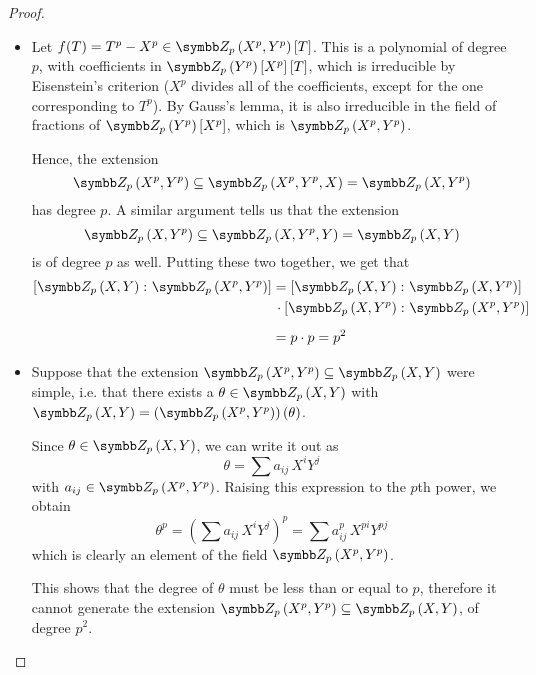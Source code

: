\begin{proof}
~
\begin{itemize}
    \item Let \(f(T) = T^p - X^p \in \ringadjoin{\adjoin[\integersmod{p}]{X^p, Y^p}}{T}\). This is a polynomial of degree \(p\), with coefficients in \(\ringadjoin{\ringadjoin{\adjoin[\integersmod{p}]{Y^p}}{X^p}}{T}\), which is irreducible by Eisenstein's criterion (\(X^p\) divides all of the coefficients, except for the one corresponding to \(T^p\)). By Gauss's lemma, it is also irreducible in the field of fractions of \(\ringadjoin{\adjoin[\integersmod{p}]{Y^p}}{X^p}\), which is \(\adjoin[\integersmod{p}]{X^p, Y^p}\).

    Hence, the extension
    \[
        \adjoin[\integersmod{p}]{X^p, Y^p} \subseteq \adjoin[\integersmod{p}]{X^p, Y^p, X} = \adjoin[\integersmod{p}]{X, Y^p}
    \] has degree \(p\). A similar argument tells us that the extension
    \[
        \adjoin[\integersmod{p}]{X, Y^p} \subseteq \adjoin[\integersmod{p}]{X, Y^p, Y} = \adjoin[\integersmod{p}]{X, Y}
    \]
    is of degree \(p\) as well. Putting these two together, we get that
    \begin{align*}
        \degree{\adjoin[\integersmod{p}]{X, Y}}{\adjoin[\integersmod{p}]{X^p, Y^p}} &= \degree{\adjoin[\integersmod{p}]{X, Y}}{\adjoin[\integersmod{p}]{X, Y^p}} \\
        &\, \cdot \degree{\adjoin[\integersmod{p}]{X, Y^p}}{\adjoin[\integersmod{p}]{X^p, Y^p}} \\[0.5em]
        &= p \cdot p = p^2
    \end{align*}

    \item Suppose that the extension \(\adjoin[\integersmod{p}]{X^p, Y^p} \subseteq \adjoin[\integersmod{p}]{X, Y}\) were simple, i.e. that there exists a \(\theta \in \adjoin[\integersmod{p}]{X, Y}\) with \(\adjoin[\integersmod{p}]{X, Y} = \adjoin[\left(\adjoin[\integersmod{p}]{X^p, Y^p}\right)]{\theta}\).
    
    Since \(\theta \in \adjoin[\integersmod{p}]{X, Y}\), we can write it out as
    \[
        \theta = \sum a_{i j} \, X^i Y^j
    \]
    with \(a_{i j} \in \adjoin[\integersmod{p}]{X^p, Y^p}\). Raising this expression to the \(p\)th power, we obtain
    \[
        \theta^p = \left(\sum a_{i j} \, X^i Y^j\right)^p = \sum a_{i j}^p \, X^{pi} Y^{pj}
    \]
    which is clearly an element of the field \(\adjoin[\integersmod{p}]{X^p, Y^p}\).
    
    This shows that the degree of \(\theta\) must be less than or equal to \(p\), therefore it cannot generate the extension \(\adjoin[\integersmod{p}]{X^p, Y^p} \subseteq \adjoin[\integersmod{p}]{X, Y}\), of degree \(p^2\).


\end{itemize}
\end{proof}

